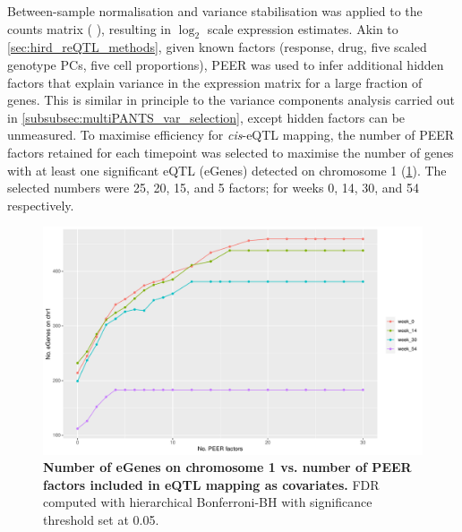 Between-sample normalisation and variance stabilisation was applied to the counts matrix ( \autocite{love2014ModeratedEstimationFold}), resulting in $\log_2$ scale expression estimates.
Akin to \cref{sec:hird_reQTL_methods},
given known factors (response, drug, five scaled genotype \glspl{PC}, five cell proportions), 
{PEER} \autocite{stegle2012UsingProbabilisticEstimation} was used to infer additional hidden factors that explain variance in the expression matrix for a large fraction of genes.
This is similar in principle to the variance components analysis carried out in \cref{subsubsec:multiPANTS_var_selection}, except hidden factors can be unmeasured.
To maximise efficiency for \textit{cis}-\gls{eQTL} mapping, 
the number of PEER factors retained for each timepoint was selected to maximise the number of genes with at least one significant \gls{eQTL} (eGenes) detected on chromosome 1 (\cref{fig:multipants_reqtl_PEER_k_choice}).
The selected numbers were 25, 20, 15, and 5 factors; for weeks 0, 14, 30, and 54 respectively.

\begin{figure}
    \centering
    \includegraphics[width=1.0\textwidth,page=1]{mainmatter/figures/chapter_04/count_eGenes.signif_eGenes_vs_PEER_n.dataset_multiPANTS.chr_1.pdf}
    \caption[
    ]{
        \textbf{Number of eGenes on chromosome 1 vs. number of PEER factors included in \gls{eQTL} mapping as covariates.}
        \gls{FDR} computed with hierarchical Bonferroni-\gls{BH} \autocite{huang2018PowerFalseDiscovery} with significance threshold set at 0.05.
    }
    \label{fig:multipants_reqtl_PEER_k_choice}
\end{figure}

